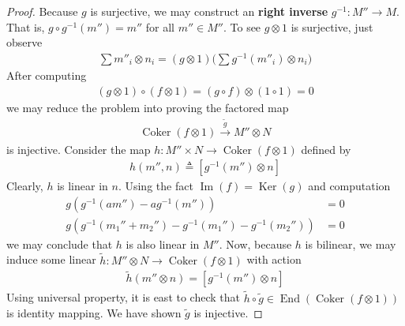 \documentclass{report}
\begin{document}
\begin{proof}
  Because $g$ is surjective, we may construct an \textbf{right inverse} $g^{-1}:M''\rightarrow M$. That is, $g \circ g^{-1}(m'')=m''$ for all $m'' \in M''$. To see $g\otimes  1$ is surjective, just observe 
\begin{align*}
  \sum m''_i \otimes  n_i= (g \otimes  1) \Big(\sum g^{-1}(m''_i) \otimes  n_i\Big)
\end{align*}
After computing 
\begin{align*}
(g \otimes  1)\circ (f\otimes  1)= (g\circ f)\otimes  (1 \circ 1)= 0
\end{align*}
we may reduce the problem into proving the factored map 
\begin{align*}
\operatorname{Coker}(f\otimes 1) \overset{\tilde{g}}{\longrightarrow } M'' \otimes  N
\end{align*}
is injective. Consider the map $h:M''\times N \rightarrow \operatorname{Coker}(f\otimes  1)$ defined by 
\begin{align*}
h(m'',n)\triangleq [g^{-1}(m'')\otimes  n]
\end{align*}
Clearly, $h$ is linear in $n$. Using the fact $\operatorname{Im}(f)=\operatorname{Ker}(g)$ and computation  
\begin{align*}
g(g^{-1}(am'')-ag^{-1}(m''))&=0\\
g(g^{-1}(m_1''+m_2'')-g^{-1}(m_1'')-g^{-1}(m_2''))&=0
\end{align*}
we may conclude that $h$ is also linear in  $M''$. Now, because $h$ is bilinear, we may induce some linear $\tilde{h}:M''\otimes  N\rightarrow \operatorname{Coker}(f\otimes  1)$ with action 
\begin{align*}
\tilde{h} (m''\otimes  n)=[g^{-1}(m'')\otimes  n]
\end{align*}
Using universal property, it is east to check that $\tilde{h}\circ \tilde{g} \in \operatorname{End}(\operatorname{Coker}(f\otimes  1))$ is identity mapping. We have shown $\tilde{g}$ is injective. 
\end{proof}
\end{document}
